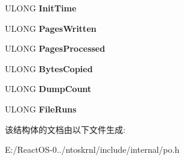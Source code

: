 \begin{DoxyCompactItemize}
U\+L\+O\+NG {\bfseries Init\+Time}
\item 
\mbox{\label{struct___p_o___h_i_b_e_r___p_e_r_f_a4fb30ce55d242fa693cbcb6bcfcd642c}} 
U\+L\+O\+NG {\bfseries Pages\+Written}
\item 
\mbox{\label{struct___p_o___h_i_b_e_r___p_e_r_f_aa6301c5a97c8bdd3eee93c44139cd965}} 
U\+L\+O\+NG {\bfseries Pages\+Processed}
\item 
\mbox{\label{struct___p_o___h_i_b_e_r___p_e_r_f_a1e191001b52be5b9d183ab0be57d9736}} 
U\+L\+O\+NG {\bfseries Bytes\+Copied}
\item 
\mbox{\label{struct___p_o___h_i_b_e_r___p_e_r_f_af08b82944be6839475f3b724fc4448a7}} 
U\+L\+O\+NG {\bfseries Dump\+Count}
\item 
\mbox{\label{struct___p_o___h_i_b_e_r___p_e_r_f_abfcefe95c527f393c0a59bc2a567d769}} 
U\+L\+O\+NG {\bfseries File\+Runs}
\end{DoxyCompactItemize}


该结构体的文档由以下文件生成\+:\begin{DoxyCompactItemize}
\item 
E\+:/\+React\+O\+S-\/0../ntoskrnl/include/internal/po.\+h\end{DoxyCompactItemize}
